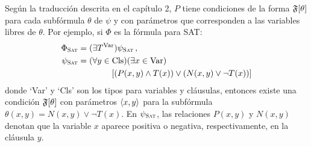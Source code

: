 Según la traducción descrita en el capítulo 2, 
$P$ tiene condiciones de la forma $\mathfrak{F}[\theta]$
para cada subfórmula $\theta$ de $\psi$ y con parámetros que corresponden a las
variables libres de $\theta$. Por ejemplo, si $\Phi$ es la fórmula para SAT:
\begin{alignat*}{1}
\Phi_{\textsc{Sat}} &= (\exists T^\text{Var})\psi_{\textsc{Sat}} \,, \\
\psi_{\textsc{Sat}} &= (\forall y\in \text{Cls})(\exists x\in\text{Var}) \notag \\
          &\quad\quad\quad\quad
               [(P(x,y) \land T(x)) \lor (N(x,y) \lor \neg T(x))]
\end{alignat*}
donde `Var' y `Cls' son los tipos para variables y cláusulas,
entonces existe una condición $\mathfrak{F}[\theta]$ con parámetros
$\langle x,y \rangle$ para la subfórmula $\theta(x,y)=N(x,y)\lor\neg T(x)$.
En $\psi_{\textsc{Sat}}$, las relaciones $P(x,y)$ y $N(x,y)$ denotan
que la variable $x$ aparece positiva o negativa, respectivamente, en la
cláusula $y$.



